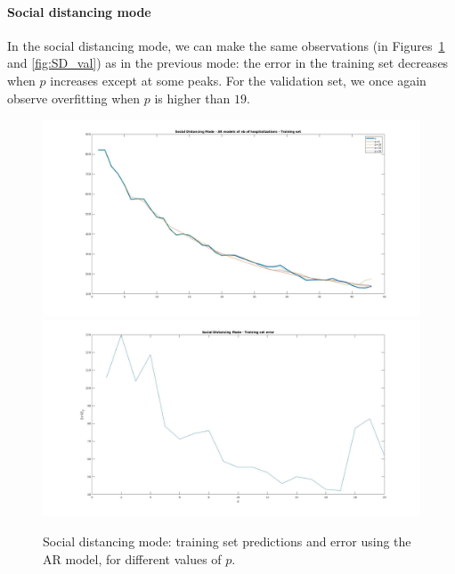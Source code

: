 \documentclass[11pt]{article}
\begin{document}
\paragraph{Social distancing mode}
In the social distancing mode, we can make the same observations (in Figures~\ref{fig:SD_train} and \ref{fig:SD_val}) as in the previous mode: the error in the training set decreases when \(p\) increases except at some peaks.
For the validation set, we once again observe overfitting when \(p\) is higher than \(19\).
\begin{figure}[h!]
\includegraphics[scale=0.25]{SD_train.jpg}
\includegraphics[scale=0.25]{SD_Err_Train.jpg}
\caption{Social distancing mode: training set predictions and error using the AR model, for different values of \(p\).}
\label{fig:SD_train}
\end{figure}
\end{document}
